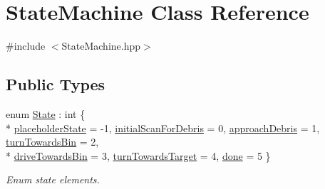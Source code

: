 \hypertarget{classStateMachine}{}\section{State\+Machine Class Reference}
\label{classStateMachine}


{\ttfamily \#include $<$State\+Machine.\+hpp$>$}

\subsection*{Public Types}
\begin{DoxyCompactItemize}
\item 
enum \hyperlink{classStateMachine_a08a90356de9073dd0ee4d56b74d2e823}{State} \+: int \{ \\*
\hyperlink{classStateMachine_a08a90356de9073dd0ee4d56b74d2e823a016d5abef569ab6b71056250fe22521d}{placeholder\+State} = -\/1, 
\hyperlink{classStateMachine_a08a90356de9073dd0ee4d56b74d2e823aab795cc7ada954f7046748f8e88917a8}{initial\+Scan\+For\+Debris} = 0, 
\hyperlink{classStateMachine_a08a90356de9073dd0ee4d56b74d2e823a9b5e93ae092b0bac501ec9e841cc0fd5}{approach\+Debris} = 1, 
\hyperlink{classStateMachine_a08a90356de9073dd0ee4d56b74d2e823a389652ffeb926cc37fd7503492a63d7b}{turn\+Towards\+Bin} = 2, 
\\*
\hyperlink{classStateMachine_a08a90356de9073dd0ee4d56b74d2e823a25a1d720a624c4c11aa7c972337a1d39}{drive\+Towards\+Bin} = 3, 
\hyperlink{classStateMachine_a08a90356de9073dd0ee4d56b74d2e823a0ed933bb47dc0771235542bda24b609e}{turn\+Towards\+Target} = 4, 
\hyperlink{classStateMachine_a08a90356de9073dd0ee4d56b74d2e823ad30b1a10a1847f4f5d533d06c46a269f}{done} = 5
 \}\begin{DoxyCompactList}\small\item\em Enum state elements. \end{DoxyCompactList}
\end{DoxyCompactItemize}
